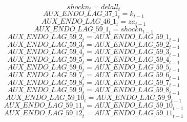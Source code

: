 \begin{dmath}
{shockn}_{t}={delall}_{t}
\end{dmath}
\begin{dmath}
{AUX\_ENDO\_LAG\_37\_1}_{t}={k}_{t-1}
\end{dmath}
\begin{dmath}
{AUX\_ENDO\_LAG\_46\_1}_{t}={za}_{t-1}
\end{dmath}
\begin{dmath}
{AUX\_ENDO\_LAG\_59\_1}_{t}={shockn}_{t-1}
\end{dmath}
\begin{dmath}
{AUX\_ENDO\_LAG\_59\_2}_{t}={AUX\_ENDO\_LAG\_59\_1}_{t-1}
\end{dmath}
\begin{dmath}
{AUX\_ENDO\_LAG\_59\_3}_{t}={AUX\_ENDO\_LAG\_59\_2}_{t-1}
\end{dmath}
\begin{dmath}
{AUX\_ENDO\_LAG\_59\_4}_{t}={AUX\_ENDO\_LAG\_59\_3}_{t-1}
\end{dmath}
\begin{dmath}
{AUX\_ENDO\_LAG\_59\_5}_{t}={AUX\_ENDO\_LAG\_59\_4}_{t-1}
\end{dmath}
\begin{dmath}
{AUX\_ENDO\_LAG\_59\_6}_{t}={AUX\_ENDO\_LAG\_59\_5}_{t-1}
\end{dmath}
\begin{dmath}
{AUX\_ENDO\_LAG\_59\_7}_{t}={AUX\_ENDO\_LAG\_59\_6}_{t-1}
\end{dmath}
\begin{dmath}
{AUX\_ENDO\_LAG\_59\_8}_{t}={AUX\_ENDO\_LAG\_59\_7}_{t-1}
\end{dmath}
\begin{dmath}
{AUX\_ENDO\_LAG\_59\_9}_{t}={AUX\_ENDO\_LAG\_59\_8}_{t-1}
\end{dmath}
\begin{dmath}
{AUX\_ENDO\_LAG\_59\_10}_{t}={AUX\_ENDO\_LAG\_59\_9}_{t-1}
\end{dmath}
\begin{dmath}
{AUX\_ENDO\_LAG\_59\_11}_{t}={AUX\_ENDO\_LAG\_59\_10}_{t-1}
\end{dmath}
\begin{dmath}
{AUX\_ENDO\_LAG\_59\_12}_{t}={AUX\_ENDO\_LAG\_59\_11}_{t-1}
\end{dmath}
